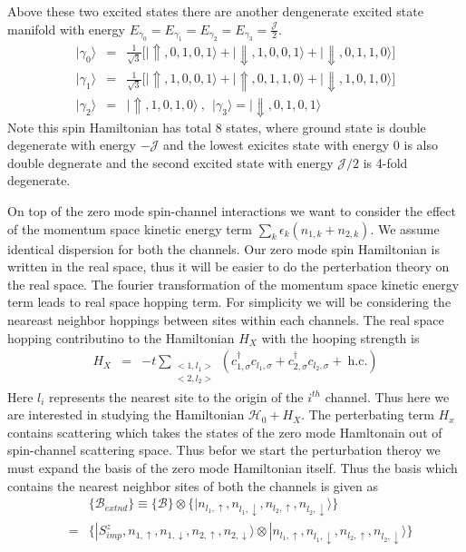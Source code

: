 \documentclass[reprint,prb,superscriptaddress]{revtex4-2}
\begin{document}
Above these two excited states there are another dengenerate excited state manifold with energy $ E_{\gamma_0}=E_{\gamma_1}=E_{\gamma_2}=E_{\gamma_3}=\frac{{\mathcal{J}}}{2}$.
\begin{eqnarray}
|\gamma_{0}\rangle &=&\frac{1}{\sqrt{3}} \bigg[|\Uparrow,0,1,0,1\rangle+|\Downarrow,1,0,0,1\rangle+|\Downarrow,0,1,1,0\rangle \bigg] \nonumber\\
|\gamma_{1}\rangle &=& \frac{1}{\sqrt{3}}\bigg[ |\Uparrow,1,0,0,1\rangle+|\Uparrow,0,1,1,0\rangle+|\Downarrow,1,0,1,0\rangle \bigg] \nonumber\\
|\gamma_{2}\rangle &=& |\Uparrow,1,0,1,0\rangle~,~~|\gamma_{3}\rangle = |\Downarrow,0,1,0,1\rangle 
\end{eqnarray}
Note this spin Hamiltonian has total $8$ states, where ground state is double degenerate with energy $-{\mathcal{J}}$ and the lowest exicites state with energy $0$ is also double degnerate and the second excited state with energy ${\mathcal{J}}/2$ is 4-fold degenerate. 
\par On top of the zero mode spin-channel interactions we want to consider the effect of the momentum space kinetic energy term $\sum_{k}\epsilon_k (n_{1,k}+n_{2,k})$. We assume identical dispersion for both the channels. Our zero mode spin Hamiltonian is written in the real space, thus it will be easier to do the perterbation theory on the real space. The fourier transformation of the momentum space kinetic energy  term leads to real space hopping term. For simplicity we will be considering the neareast neighbor hoppings between sites within each channels. The real space hopping contributino to the Hamiltonian $H_X$ with the hooping strength is 
\begin{eqnarray}
H_{X} &=& -t \displaystyle\sum_{\substack{<1,l_1> \\ <2,l_2>}} (c^{\dagger}_{1,\sigma}c_{l_1,\sigma}+c^{\dagger}_{2,\sigma}c_{l_2,\sigma}+ ~\textrm{h.c.})
\end{eqnarray}
Here $l_i$ represents the nearest site to the origin of the $i^{th}$ channel. Thus here we are interested in studying the Hamiltonian $\mathcal{H}_0+H_X$. The perterbating term $H_x$ contains scattering which takes the states of the zero mode Hamltonain out of spin-channel scattering space. Thus befor we start the perturbation theroy we must expand the basis of the zero mode Hamiltonian itself. Thus the basis which contains the nearest neighbor sites of both the channels is given as 
\begin{eqnarray}
&&\{\mathcal{B}_{extnd}\} \equiv  \{\mathcal{B}\} \otimes  \{|n_{l_1,\uparrow},n_{l_1,\downarrow},n_{l_2,\uparrow},n_{l_2,\downarrow}\rangle\} \\
&=& \{|S^z_{imp},n_{1,\uparrow},n_{1,\downarrow},n_{2,\uparrow},n_{2,\downarrow}\rangle \otimes |n_{l_1,\uparrow},n_{l_1,\downarrow},n_{l_2,\uparrow},n_{l_2,\downarrow}\rangle\} \nonumber
\end{eqnarray}
\end{document}
